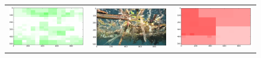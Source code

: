 \begin{figure}[h!tb]
\begin{minipage}{1.3\textwidth}
\begin{tabular}{ccc}
\includegraphics[keepaspectratio=true,width=\segwidth]{images/segment/4409_01__animals__.png} &
\includegraphics[keepaspectratio=true,width=\segwidth]{images/segment/4409_01__image__.png} &
\includegraphics[keepaspectratio=true,width=\segwidth]{images/segment/4409_01__plastic__.png} \\


\end{tabular}
\end{minipage}
\end{figure}
